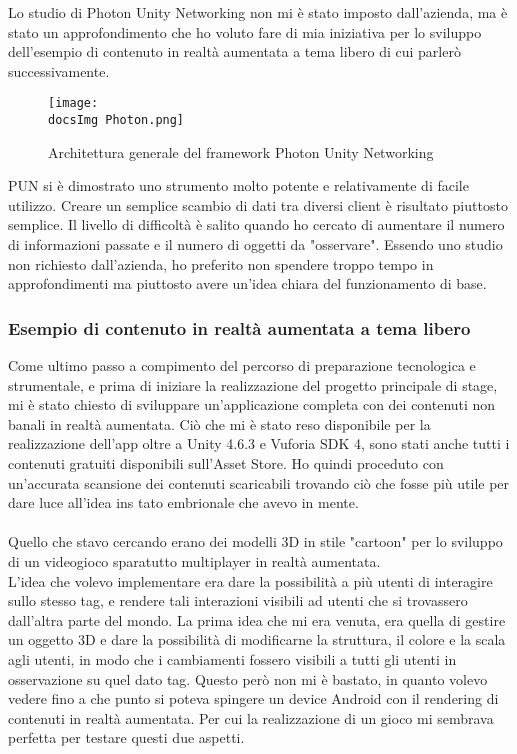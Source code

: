 Lo studio di Photon Unity Networking non mi \`e stato imposto dall'azienda, ma \`e stato un approfondimento che ho voluto fare di mia iniziativa per lo sviluppo dell'esempio di contenuto in realt\`a aumentata a tema libero di cui parler\`o successivamente.

\begin{figure}[H]
	\centering
	\texttt{[image: \\docsImg Photon.png]}
	\caption{Architettura generale del framework Photon Unity Networking}
	\label{fig:Architettura generale del framework Photon Unity Networking}
\end{figure}

PUN si \`e dimostrato uno strumento molto potente e relativamente di facile utilizzo. Creare un semplice scambio di dati tra diversi client \`e risultato piuttosto semplice. Il livello di difficolt\`a \`e salito quando ho cercato di aumentare il numero di informazioni passate e il numero di oggetti da "osservare". Essendo uno studio non richiesto dall'azienda, ho preferito non spendere troppo tempo in approfondimenti ma piuttosto avere un'idea chiara del funzionamento di base.

\subsubsection{Esempio di contenuto in realt\`a aumentata a tema libero}
Come ultimo passo a compimento del percorso di preparazione tecnologica e strumentale, e prima di iniziare la realizzazione del progetto principale di stage, mi \`e stato chiesto di sviluppare un'applicazione completa con dei contenuti non banali in realt\`a aumentata. Ci\`o che mi \`e stato reso disponibile per la realizzazione dell'app oltre a Unity 4.6.3 e Vuforia SDK 4, sono stati anche tutti i contenuti gratuiti disponibili sull'Asset Store. Ho quindi proceduto con un'accurata scansione dei contenuti scaricabili trovando ci\`o che fosse pi\`u utile per dare luce all'idea ins tato embrionale che avevo in mente.\\\\
Quello che stavo cercando erano dei modelli 3D in stile "cartoon" per lo sviluppo di un videogioco sparatutto multiplayer in realt\`a aumentata.\\
L'idea che volevo implementare era dare la possibilit\`a a pi\`u utenti di interagire sullo stesso tag, e rendere tali interazioni visibili ad utenti che si trovassero dall'altra parte del mondo. La prima idea che mi era venuta, era quella di gestire un oggetto 3D e dare la possibilit\`a di modificarne la struttura, il colore e la scala agli utenti, in modo che i cambiamenti fossero visibili a tutti gli utenti in osservazione su quel dato tag. Questo per\`o non mi \`e bastato, in quanto volevo vedere fino a che punto si poteva spingere un device Android con il rendering di contenuti in realt\`a aumentata. Per cui la realizzazione di un gioco mi sembrava perfetta per testare questi due aspetti.\\


